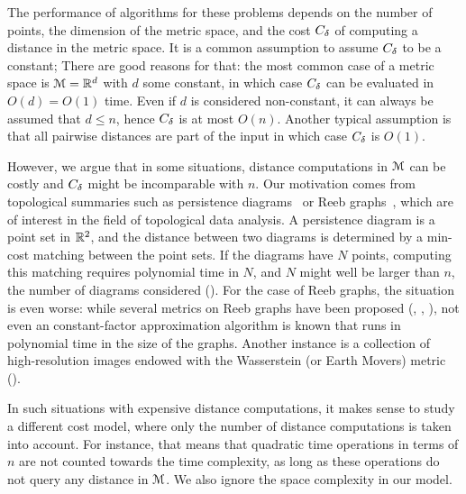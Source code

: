 \documentclass[a4paper,UKenglish,cleveref, autoref]{lipics-v2019}
\begin{document}
The performance of algorithms for these problems depends on the number of points,
the dimension of the metric space, and the cost $C_{\delta}$ of computing a distance in the metric space.
It is a common assumption to assume $C_{\delta}$ to be a constant; 
There are good reasons for that: the most common case of a metric space
is $\mathcal{M}=\mathbb{R}^d$ with $d$ some constant, in which case $C_{\delta}$ can be evaluated in $O(d)=O(1)$ time.
Even if $d$ is considered non-constant,
it can always be assumed that $d\leq n$, hence $C_{\delta}$ is at most $O(n)$.
Another typical assumption is that all pairwise distances are part of the input
in which case $C_{\delta}$ is $O(1)$.

However, we argue that in some situations, distance computations
in $\mathcal{M}$ can be costly and $C_{\delta}$ might be incomparable
with $n$. Our motivation comes from topological summaries
such as persistence diagrams~\cite{elz-topological} or Reeb graphs~\cite{reeb-survey}, which are of interest
in the field of topological data analysis. A persistence diagram
is a point set in $\mathbb{R}^2$, and the distance between two diagrams
is determined by a min-cost matching between the point sets.
If the diagrams have $N$ points, computing this matching requires
polynomial time in $N$, and $N$ might well be larger than $n$, the number
of diagrams considered (\cite{cohen2007stability}). For the case of Reeb graphs, the situation is even
worse: while several metrics on Reeb graphs have been proposed (\cite{bauer2014measuring}, \cite{de2016categorified},
\cite{di2016edit}),
not even an constant-factor approximation algorithm is known that runs
in polynomial time in the size of the graphs.
Another instance is a collection of high-resolution images
endowed with the Wasserstein (or Earth Movers) metric (\cite{rubner2000earth}).

In such situations with expensive distance computations, 
it makes sense to study a different cost model, where only the number of distance computations
is taken into account. For instance, that means that quadratic time operations in terms of $n$
are not counted towards the time complexity, as long as these operations do not query any distance
in $\mathcal{M}$. We also ignore the space complexity in our model.
\end{document}
